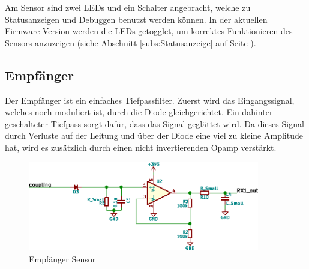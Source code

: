 Am Sensor sind zwei LEDs und ein Schalter angebracht, welche zu Statusanzeigen
und Debuggen benutzt werden k\"onnen. In der aktuellen Firmware-Version werden
die LEDs getogglet,  um korrektes Funktionieren des  Sensors anzuzeigen (siehe
Abschnitt \ref{subs:Statusanzeige} auf Seite \pageref{subs:Statusanzeige}).

\clearpage
\subsection{Empf\"anger}
\label{subsec:hw:sensor:receiver}

Der   Empf\"anger  ist   ein  einfaches   Tiefpassfilter.   Zuerst   wird  das
Eingangssignal,  welches  noch  moduliert   ist,  durch  die  Diode  
gleichgerichtet. Ein dahinter  geschalteter Tiefpass  sorgt daf\"ur,  dass das
Signal gegl\"attet wird. Da  dieses Signal durch Verluste auf  der Leitung und
\"uber der Diode eine viel zu kleine Amplitude hat, wird es zus\"atzlich durch
einen nicht invertierenden Opamp verst\"arkt.

\begin{figure}[h!t]
    \centering
    \includegraphics[width=0.9\textwidth]{images/sensor-sch/sensor--sch--receiver.eps}
    \caption[Sensor: Schema Empf\"anger]{Empf\"anger Sensor}
\end{figure}
